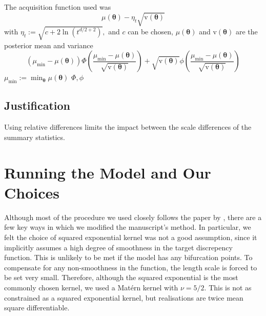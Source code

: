 The acquisition function used was $$\mu(\bm\theta) - \eta_t\sqrt{\mathrm{v}(\bm\theta)}$$ with $\eta_t:= \sqrt{c + 2\ln(t^{d/2 + 2})},$ and $c$ can be chosen, $\mu(\bm\theta)$ and $\mathrm{v}(\bm\theta)$ are the posterior mean and variance
$$(\mu_\text{min} - \mu(\bm\theta))
    \varPhi\left(\frac{\mu_\text{min} - \mu(\bm\theta)}{\sqrt{\mathrm{v}(\bm\theta)}}\right) + \sqrt{\mathrm{v}(\bm\theta)}
    \phi\left(\frac{\mu_\text{min} - \mu(\bm\theta)}{\sqrt{\mathrm{v}(\bm\theta)}}\right)$$
$\mu_\text{min} := \min_{\bm{\theta}} \mu(\bm\theta)$
$\varPhi, \phi$

\subsection*{Justification}

Using relative differences limits the impact between the scale differences of the summary statistics.

\section{Running the Model and Our Choices}

Although most of the procedure we used closely follows the paper by
\cite{gutmann_bayesian_2016}, there are a few key ways in which we modified the
manuscript's method. In particular, we felt the choice of squared exponential
kernel was not a good assumption, since it implicitly assumes a high degree of
smoothness in the target discrepency function. This is unlikely to be met if
the model has any bifurcation points. To compensate for any non-smoothness in
the function, the length scale is forced to be set very small. Therefore,
although the squared exponential is the most commonly chosen kernel,
we used a Mat\'ern kernel with $\nu = 5/2$. This is not as constrained as a
squared exponential kernel, but realisations are twice mean square
differentiable.

